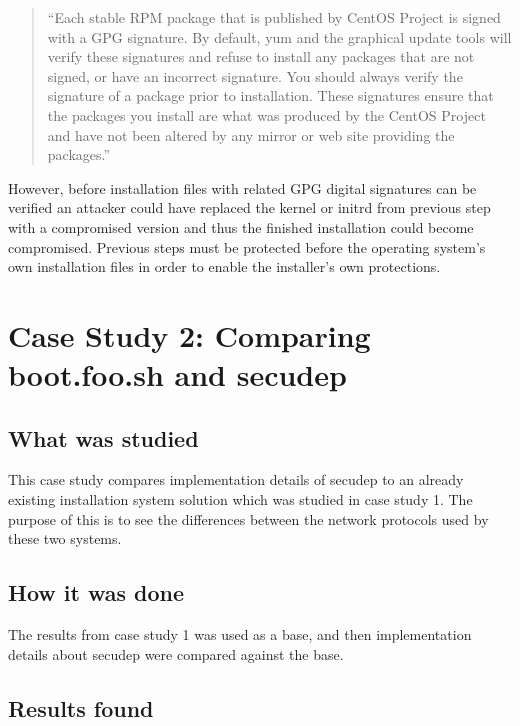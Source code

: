 \begin{quote}
``Each stable RPM package that is published by CentOS Project is signed
with a GPG signature. By default, yum and the graphical update tools
will verify these signatures and refuse to install any packages that
are not signed, or have an incorrect signature. You should always
verify the signature of a package prior to installation. These
signatures ensure that the packages you install are what was produced
by the CentOS Project and have not been altered by any mirror or
web site providing the packages.''
\end{quote}

However, before installation files with related GPG digital signatures
can be verified an attacker could have replaced the kernel or initrd
from previous step with a compromised version and thus the finished
installation could become compromised. Previous steps must be
protected before the operating system's own installation files in
order to enable the installer's own protections.


\section{Case Study 2: Comparing boot.foo.sh and secudep}
\label{sec:casestudy2}

\subsection{What was studied}

This case study compares implementation details of secudep to an
already existing installation system solution which was studied in
case study 1. The purpose of this is to see the differences between
the network protocols used by these two systems.

\subsection{How it was done}

The results from case study 1 was used as a base, and then
implementation details about secudep were compared against the base.

\subsection{Results found}

